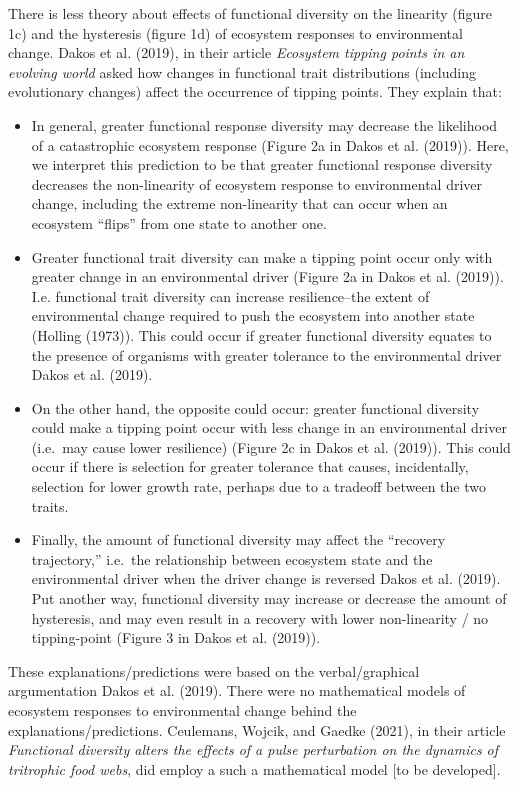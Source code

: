 \documentclass{article}
\begin{document}
There is less theory about effects of functional diversity on the
linearity (figure 1c) and the hysteresis (figure 1d) of ecosystem
responses to environmental change. Dakos et al. (2019), in their article
\emph{Ecosystem tipping points in an evolving world} asked how changes
in functional trait distributions (including evolutionary changes)
affect the occurrence of tipping points. They explain that:

\begin{itemize}
\item
  In general, greater functional response diversity may decrease the
  likelihood of a catastrophic ecosystem response (Figure 2a in Dakos et
  al. (2019)). Here, we interpret this prediction to be that greater
  functional response diversity decreases the non-linearity of ecosystem
  response to environmental driver change, including the extreme
  non-linearity that can occur when an ecosystem ``flips'' from one
  state to another one.
\item
  Greater functional trait diversity can make a tipping point occur only
  with greater change in an environmental driver (Figure 2a in Dakos et
  al. (2019)). I.e. functional trait diversity can increase
  resilience--the extent of environmental change required to push the
  ecosystem into another state (Holling (1973)). This could occur if
  greater functional diversity equates to the presence of organisms with
  greater tolerance to the environmental driver Dakos et al. (2019).
\item
  On the other hand, the opposite could occur: greater functional
  diversity could make a tipping point occur with less change in an
  environmental driver (i.e.~may cause lower resilience) (Figure 2c in
  Dakos et al. (2019)). This could occur if there is selection for
  greater tolerance that causes, incidentally, selection for lower
  growth rate, perhaps due to a tradeoff between the two traits.
\item
  Finally, the amount of functional diversity may affect the ``recovery
  trajectory,'' i.e.~the relationship between ecosystem state and the
  environmental driver when the driver change is reversed Dakos et al.
  (2019). Put another way, functional diversity may increase or decrease
  the amount of hysteresis, and may even result in a recovery with lower
  non-linearity / no tipping-point (Figure 3 in Dakos et al. (2019)).
\end{itemize}

These explanations/predictions were based on the verbal/graphical
argumentation Dakos et al. (2019). There were no mathematical models of
ecosystem responses to environmental change behind the
explanations/predictions. Ceulemans, Wojcik, and Gaedke (2021), in their
article \emph{Functional diversity alters the effects of a pulse
perturbation on the dynamics of tritrophic food webs}, did employ a such
a mathematical model {[}to be developed{]}.
\end{document}
